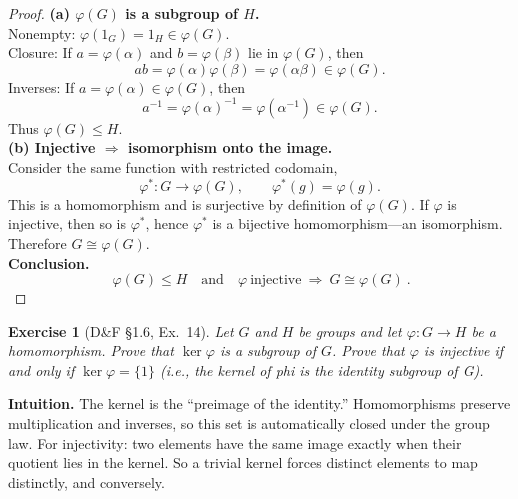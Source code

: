 \documentclass[12pt]{article}
\newtheorem{exercise}[theorem]{Exercise}
\theoremstyle{definition}
\begin{document}
\begin{proof}
\noindent\textbf{(a) $\varphi(G)$ is a subgroup of $H$.}\\
\noindent Nonempty: $\varphi(1_G)=1_H\in \varphi(G)$.\\
\noindent Closure: If $a=\varphi(\alpha)$ and $b=\varphi(\beta)$ lie in $\varphi(G)$, then
\[
ab=\varphi(\alpha)\varphi(\beta)=\varphi(\alpha\beta)\in\varphi(G).
\]
\noindent Inverses: If $a=\varphi(\alpha)\in\varphi(G)$, then
\[
a^{-1}=\varphi(\alpha)^{-1}=\varphi(\alpha^{-1})\in\varphi(G).
\]
Thus $\varphi(G)\le H$.\\

\noindent\textbf{(b) Injective $\Rightarrow$ isomorphism onto the image.}\\
\noindent Consider the same function with restricted codomain,
\[
\varphi^\ast:G\longrightarrow \varphi(G),\qquad \varphi^\ast(g)=\varphi(g).
\]
This is a homomorphism and is surjective by definition of $\varphi(G)$. If $\varphi$ is injective, then so is $\varphi^\ast$, hence $\varphi^\ast$ is a bijective homomorphism—an isomorphism. Therefore $G\cong \varphi(G)$.\\

\noindent\textbf{Conclusion.}
\[
\boxed{\ \varphi(G)\le H\quad\text{and}\quad \varphi\ \text{injective}\ \Longrightarrow\ G\cong \varphi(G)\ }.
\]
\end{proof}

\newpage

\begin{exercise}[D\&F §1.6, Ex.~14]
Let $G$ and $H$ be groups and let $\varphi:G\to H$ be a homomorphism. 
Prove that $\ker\varphi$ is a subgroup of $G$. 
Prove that $\varphi$ is injective if and only if $\ker\varphi=\{1\}$ (i.e., the kernel of phi is the identity subgroup of G).
\end{exercise}

\dotfill

\noindent\textbf{Intuition.}
The kernel is the “preimage of the identity.” Homomorphisms preserve multiplication and inverses, so this set is automatically closed under the group law.  
For injectivity: two elements have the same image exactly when their quotient lies in the kernel.  
So a trivial kernel forces distinct elements to map distinctly, and conversely.  

\dotfill
\end{document}
